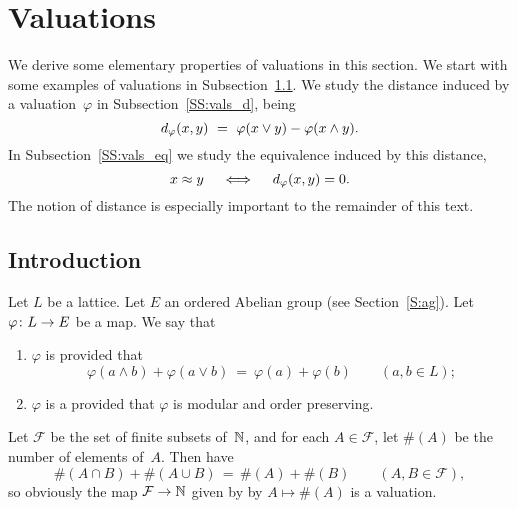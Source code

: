 \documentclass[main.tex]{subfiles}
\begin{document}
\section{Valuations}
\label{S:vals}
We derive some elementary properties of valuations in this section.
We start with some examples of valuations in Subsection~\ref{SS:vals_intro}.
We study the distance 
induced by a valuation~$\varphi$
in Subsection~\ref{SS:vals_d}, being
\begin{equation*}
d_{\smash{\varphi}}(x,y) \ =\ \varphi(x\vee y) - \varphi(x\wedge y).
\end{equation*}
In Subsection~\ref{SS:vals_eq}
we study the equivalence induced by this distance,
\begin{equation*}
x\approx y\quad\iff\quad d_{\smash{\varphi}}(x,y)=0.
\end{equation*}
The notion of distance 
is especially important to the remainder of this text.
\subsection{Introduction}
\label{SS:vals_intro}
\noindent
%
%
\begin{dfn}

\label{D:val}
Let $L$ be a lattice. 
Let $E$ an ordered Abelian group
(see Section~\ref{S:ag}).
Let  $\varphi\colon L \rightarrow E$ be a map.
We say that
\begin{enumerate}
\item
\label{D:val-mod}
$\varphi$ is  provided that
\begin{equation*}
\varphi(a\wedge b) + \varphi(a \vee b)
\ =\ 
\varphi(a) + \varphi(b)
\qquad(a,b\in L);
\end{equation*}

\item
\label{D:val-val}
$\varphi$ is a 
provided that $\varphi$ is modular and order preserving.
\end{enumerate}
\end{dfn}

\begin{ex}
Let $\mathcal{F}$ be the set of finite subsets of~$\mathbb{N}$,
and for each $A\in \mathcal{F}$,
let $\#(A)$ be the number of elements of~$A$.
Then have 
\begin{equation*}
\#(A\cap B) + \#(A\cup B) \,=\, \#(A) + \#(B)
\qquad(A,B\in\mathcal{F}),
\end{equation*}
so obviously the map $\mathcal{F} \rightarrow \mathbb{N}$
given by by $A\mapsto \#(A)$ is a valuation.
\end{ex}
\end{document}
